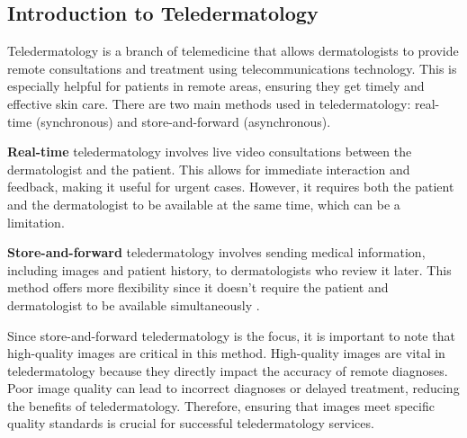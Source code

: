 \subsection{Introduction to Teledermatology}
\label{sub:IntroductionTeledermatology}
Teledermatology is a branch of telemedicine that allows dermatologists to provide remote consultations and treatment using telecommunications technology. This is especially helpful for patients in remote areas, ensuring they get timely and effective skin care. There are two main methods used in teledermatology: real-time (synchronous) and store-and-forward (asynchronous).\par
\vspace{\baselineskip}
\noindent
\textbf{Real-time} teledermatology involves live video consultations between the dermatologist and the patient. This allows for immediate interaction and feedback, making it useful for urgent cases. However, it requires both the patient and the dermatologist to be available at the same time, which can be a limitation. \par
\vspace{\baselineskip}
\noindent
\textbf{Store-and-forward} teledermatology involves sending medical information, including images and patient history, to dermatologists who review it later. This method offers more flexibility since it doesn’t require the patient and dermatologist to be available simultaneously \autocite{SaF}. \par
\vspace{\baselineskip}
\noindent
Since store-and-forward teledermatology is the focus, it is important to note that high-quality images are critical in this method. High-quality images are vital in teledermatology because they directly impact the accuracy of remote diagnoses. Poor image quality can lead to incorrect diagnoses or delayed treatment, reducing the benefits of teledermatology. Therefore, ensuring that images meet specific quality standards is crucial for successful teledermatology services.

